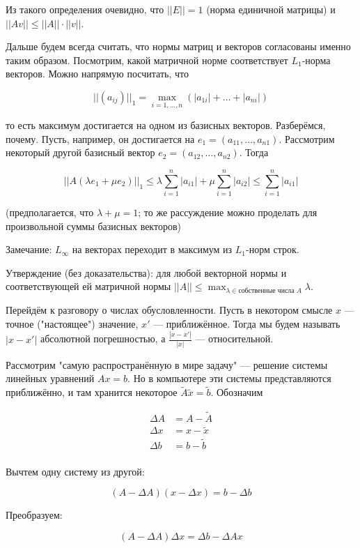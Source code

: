 \documentclass[12pt]{article}
\begin{document}
Из такого определения очевидно, что $||E|| = 1$ (норма единичной матрицы) и $||Av|| \leq ||A|| \cdot ||v||$.

Дальше будем всегда считать, что нормы матриц и векторов согласованы именно таким образом. Посмотрим, какой матричной норме соответствует $L_1$-норма векторов. Можно напрямую посчитать, что

\[
||(a_{ij})||_1 = \max_{i = 1, \ldots, n} (|a_{1i}| + \ldots + |a_{ni}|)
\]

то есть максимум достигается на одном из базисных векторов. Разберёмся, почему. Пусть, например, он достигается на $e_1 = (a_{11}, \ldots, a_{n1})$. Рассмотрим некоторый другой базисный вектор $e_2 = (a_{12}, \ldots, a_{n2})$. Тогда

\[
||A(\lambda e_1 + \mu e_2)||_1 \leq \lambda \sum_{i = 1}^n |a_{i1}| + \mu \sum_{i = 1}^n |a_{i2}| \leq \sum_{i = 1}^n |a_{i1}|
\]

(предполагается, что $\lambda + \mu = 1$; то же рассуждение можно проделать для произвольной суммы базисных векторов)

Замечание: $L_\infty$ на векторах переходит в максимум из $L_1$-норм строк.

Утверждение (без доказательства): для любой векторной нормы и соответствующей ей матричной нормы $||A|| \leq \max_{\lambda \in \text{собственные числа } A} \lambda$.

Перейдём к разговору о числах обусловленности. Пусть в некотором смысле $x$ — точное ("настоящее") значение, $x'$ — приближённое. Тогда мы будем называть $|x - x'|$ абсолютной погрешностью, а $\frac {|x - x'|} {|x|}$ — относительной.

Рассмотрим "самую распространённую в мире задачу" — решение системы линейных уравнений $Ax = b$. Но в компьютере эти системы представляются приближённо, и там хранится некоторое $\tilde{A} \tilde{x} = \tilde{b}$. Обозначим

\begin{align*}
\Delta A &= A - \tilde{A} \\
\Delta x &= x - \tilde{x} \\
\Delta b &= b - \tilde{b} \\
\end{align*}

Вычтем одну систему из другой:

\[
(A - \Delta A) (x - \Delta x) = b - \Delta b
\]

Преобразуем:

\[
(A - \Delta A) \Delta x = \Delta b - \Delta A x
\]
\end{document}

